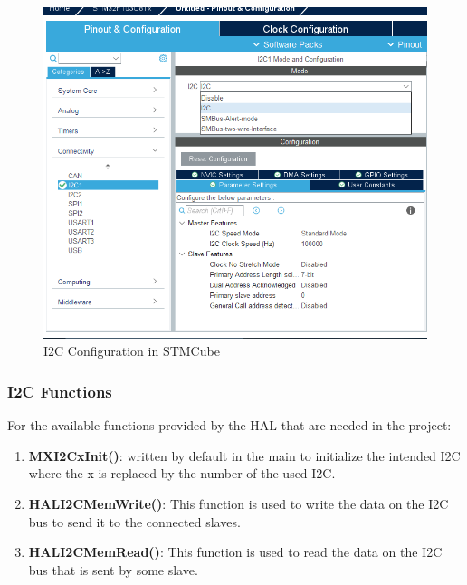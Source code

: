  \begin{figure}
     \centering
     \includegraphics[width=.8\textwidth]{figure/4_7.png}
     \caption{I2C Configuration in STMCube}
     \label{fig:i2c-config}
 \end{figure}
 
 \subsubsection{I2C Functions}

For the available functions provided by the HAL that are needed in the project:

\begin{enumerate}
    \item \textbf{MX\textunderscore I2Cx\textunderscore Init()}: written by default in the main to initialize the intended I2C
where the x is replaced by the number of the used I2C.
    \item \textbf{HAL\textunderscore I2C\textunderscore Mem\textunderscore Write()}: This function is used to write the data on the I2C bus to send it to the connected slaves.
    \item \textbf{HAL\textunderscore I2C\textunderscore Mem\textunderscore Read()}: This function is used to read the data on the I2C bus that is sent by some slave.
\end{enumerate}